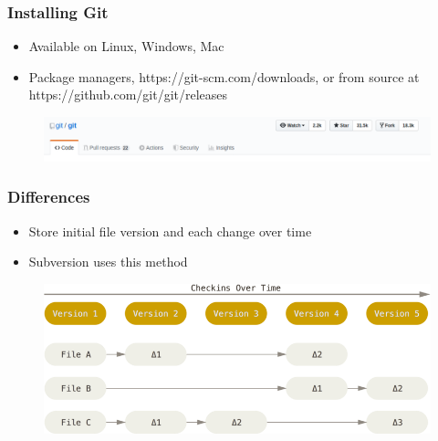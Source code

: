 \documentclass{beamer}
\begin{document}
\begin{frame}
	\frametitle{Installing Git}
	\begin{itemize}
		\item{Available on Linux, Windows, Mac}
		\item{Package managers, https://git-scm.com/downloads, or from source at https://github.com/git/git/releases}
	\end{itemize}
	\begin{figure}
		\includegraphics[scale=0.3]{gitgit.png}
	\end{figure}
\end{frame}

\begin{frame}
	\frametitle{Differences}
	\begin{itemize}
		\item{Store initial file version and each change over time}
		\item{Subversion uses this method}
	\end{itemize}
	\begin{figure}
		\includegraphics[scale=0.3]{Differences-0.png}
	\end{figure}

\end{frame}
\end{document}
